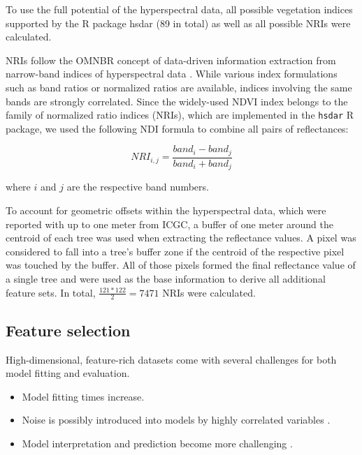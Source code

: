 \documentclass[peerreview]{IEEEtran}
\begin{document}
To use the full potential of the hyperspectral data, all possible vegetation indices supported by the R package hsdar (89 in total) as well as all possible \ac{NRI}s were calculated.

NRIs follow the \ac{OMNBR} concept of data-driven information extraction from narrow-band indices of hyperspectral data \cite{thenkabail2000,thenkabail2018}.
While various index formulations such as band ratios or normalized ratios are available, indices involving the same bands are strongly correlated.
Since the widely-used NDVI index belongs to the family of normalized ratio indices (NRIs), which are implemented in the \texttt{hsdar} R package, we used the following NDI formula to combine all pairs of reflectances:

\begin{equation}
	NRI_{i,j} = \frac{band_{i} - band_{j}}{band_{i} + band_{j}}
\end{equation}

\noindent
where \(i\) and \(j\) are the respective band numbers.

\bigbreak{}

To account for geometric offsets within the hyperspectral data, which were reported with up to one meter from \ac{ICGC}, a buffer of one meter around the centroid of each tree was used when extracting the reflectance values.
A pixel was considered to fall into a tree's buffer zone if the centroid of the respective pixel was touched by the buffer.
All of those pixels formed the final reflectance value of a single tree and were used as the base information to derive all additional feature sets.
In total, \(\frac{121*122}{2} = 7471\) NRIs were calculated.

\subsection{Feature selection}

High-dimensional, feature-rich datasets come with several challenges for both model fitting and evaluation.

\begin{itemize}
	\item Model fitting times increase.
	\item Noise is possibly introduced into models by highly correlated variables \cite{johnstoneiainm.2009}.
	\item Model interpretation and prediction become more challenging \cite{johnstoneiainm.2009}.
\end{itemize}
\end{document}
